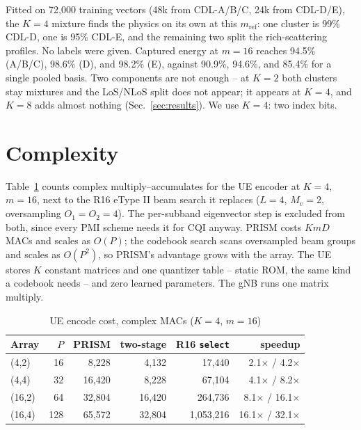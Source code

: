 \documentclass[conference]{IEEEtran}
\begin{document}
Fitted on 72{,}000 training vectors (48k from CDL-A/B/C, 24k from CDL-D/E), the $K{=}4$ mixture finds the physics on its own at this $m_{\mathrm{ref}}$: one cluster is 99\% CDL-D, one is 95\% CDL-E, and the remaining two split the rich-scattering profiles. No labels were given. Captured energy at $m{=}16$ reaches 94.5\% (A/B/C), 98.6\% (D), and 98.2\% (E), against 90.9\%, 94.6\%, and 85.4\% for a single pooled basis. Two components are not enough -- at $K{=}2$ both clusters stay mixtures and the LoS/NLoS split does not appear; it appears at $K{=}4$, and $K{=}8$ adds almost nothing (Sec.~\ref{sec:results}). We use $K{=}4$: two index bits.

\section{Complexity}
Table~\ref{tab:complexity} counts complex multiply--accumulates for the UE encoder at $K{=}4$, $m{=}16$, next to the R16 eType II beam search it replaces ($L{=}4$, $M_v{=}2$, oversampling $O_1{=}O_2{=}4$). The per-subband eigenvector step is excluded from both, since every PMI scheme needs it for CQI anyway. PRISM costs $KmD$ MACs and scales as $O(P)$; the codebook search scans oversampled beam groups and scales as $O(P^2)$, so PRISM's advantage grows with the array. The UE stores $K$ constant matrices and one quantizer table -- static ROM, the same kind a codebook needs -- and zero learned parameters. The gNB runs one matrix multiply.

\begin{table}[t]
\centering
\caption{UE encode cost, complex MACs ($K{=}4$, $m{=}16$)}
\label{tab:complexity}
\begin{tabular}{@{}lrrrrr@{}}
\toprule
Array & $P$ & PRISM & two-stage & R16 \texttt{select} & speedup \\
\midrule
(4,2)  & 16  & 8{,}228  & 4{,}132  & 17{,}440    & 2.1$\times$ / 4.2$\times$ \\
(4,4)  & 32  & 16{,}420 & 8{,}228  & 67{,}104    & 4.1$\times$ / 8.2$\times$ \\
(16,2) & 64  & 32{,}804 & 16{,}420 & 264{,}736   & 8.1$\times$ / 16.1$\times$ \\
(16,4) & 128 & 65{,}572 & 32{,}804 & 1{,}053{,}216 & 16.1$\times$ / 32.1$\times$ \\
\bottomrule
\end{tabular}
\end{table}
\end{document}
